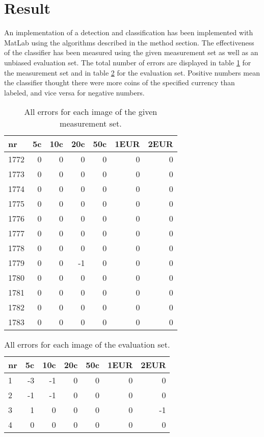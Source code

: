 \documentclass[doc/report.tex]{subfile}
\begin{document}
\section{Result}

An implementation of a detection and classification has been implemented with
MatLab using the algorithms described in the method section. The effectiveness
of the classifier has been measured using the given measurement set as well as
an unbiased evaluation set. The total number of errors are displayed in table
\ref{tab:meas} for the measurement set and in table \ref{tab:eval} for the
evaluation set. Positive numbers mean the classifier thought there were more
coins of the specified currency than labeled, and vice versa for negative
numbers.

\begin{table}
    \centering
    \begin{tabular}{lrrrrrr}
      nr  & 5c & 10c & 20c & 50c & 1EUR & 2EUR \\\hline
      1772 & 0  & 0   & 0   & 0   & 0   & 0 \\
      1773 & 0  & 0   & 0   & 0   & 0   & 0 \\
      1774 & 0  & 0   & 0   & 0   & 0   & 0 \\
      1775 & 0  & 0   & 0   & 0   & 0   & 0 \\
      1776 & 0  & 0   & 0   & 0   & 0   & 0 \\
      1777 & 0  & 0   & 0   & 0   & 0   & 0 \\
      1778 & 0  & 0   & 0   & 0   & 0   & 0 \\
      1779 & 0  & 0   & -1  & 0   & 0   & 0 \\
      1780 & 0  & 0   & 0   & 0   & 0   & 0 \\
      1781 & 0  & 0   & 0   & 0   & 0   & 0 \\
      1782 & 0  & 0   & 0   & 0   & 0   & 0 \\
      1783 & 0  & 0   & 0   & 0   & 0   & 0 \\
    \end{tabular}
    \caption{All errors for each image of the given measurement set.}
    \label{tab:meas}
\end{table}

\begin{table}
    \centering
    \begin{tabular}{lrrrrrr}
      nr  & 5c & 10c & 20c & 50c & 1EUR & 2EUR \\\hline
      1   & -3 & -1  & 0   & 0   & 0   & 0  \\
      2   & -1 & -1  & 0   & 0   & 0   & 0  \\
      3   & 1  & 0   & 0   & 0   & 0   & -1 \\
      4   & 0  & 0   & 0   & 0   & 0   & 0  \\
    \end{tabular}
    \caption{All errors for each image of the evaluation set.}
    \label{tab:eval}
\end{table}
\end{document}
